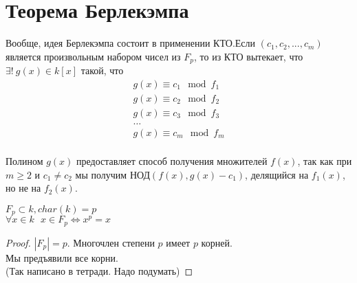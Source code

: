 \section{Теорема Берлекэмпа}

Вообще, идея Берлекэмпа состоит в применении КТО.Если $(c_1, c_2, ..., c_m)$ является произвольным набором чисел из $F_p$, то из КТО вытекает, что $\exists!~g(x) \in k[x]$
такой, что 
\[
\begin{array}{l}
g(x) \equiv c_1 \mod f_1 \\
g(x) \equiv c_2 \mod f_2 \\
g(x) \equiv c_3 \mod f_3 \\
\dots \\
g(x) \equiv c_m \mod f_m \\
\end{array}
\]

Полином $g(x)$ предоставляет способ получения множителей $f(x)$, так как при $m \geqslant 2$ и $c_1 \neq c_2$ мы получим
$\text{НОД}(f(x), g(x) - c_1)$, делящийся на $f_1(x)$, но не на $f_2(x)$.

\begin{lem}
$F_p \subset k, char(k) = p$ \\
$\forall x \in k~~~x \in F_p \Leftrightarrow x^p = x $
\end{lem}
\begin{proof}
$|F_p| = p$. Многочлен степени $p$ имеет $p$ корней. \\
Мы предъявили все корни. \\
(Так написано в тетради. Надо подумать)
\end{proof}

